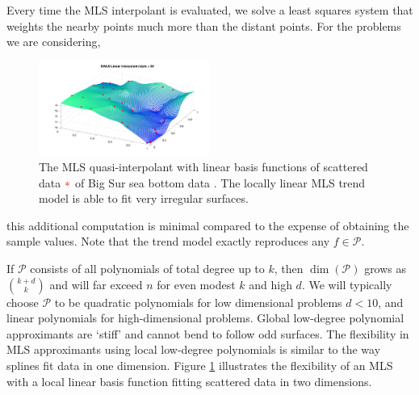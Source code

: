 \documentclass[11pt]{NSFamsart}
\newcommand{\calp}{{\mathcal{P}}}
\begin{document}
Every time the MLS interpolant is evaluated, we solve a least squares system that weights the nearby points much more than the distant points. For the problems we are considering,
\begin{figure}
\begin{center}
\includegraphics[width = 0.5\textwidth]{ProgramsImages/bigsurT.pdf}
\end{center}
\caption{The MLS quasi-interpolant with linear basis functions of scattered data {$\color{red}*$} of Big Sur sea bottom data \cite{franke1979critical}. The locally linear MLS trend model is able to fit very irregular surfaces.
\label{MLS}}
\end{figure}
this additional computation is minimal compared to the expense of obtaining the sample values. Note that the trend model exactly reproduces any $f \in \calp$.

If $\calp$ consists of all polynomials of total degree up to $k$, then $\dim(\calp)$ grows as ${k + d \choose k}$ and will far exceed $n$ for even modest $k$ and high $d$. 
We will typically choose $\calp$ to be quadratic polynomials for low dimensional problems $d<10$, and linear polynomials for high-dimensional problems. 
Global low-degree polynomial approximants are `stiff' and cannot bend to follow odd surfaces. The flexibility in MLS approximants using local low-degree polynomials is similar to the way splines fit data in one dimension. 
Figure \ref{MLS} illustrates the flexibility of an MLS with a local linear basis function fitting scattered data in two dimensions. 


\end{document}
